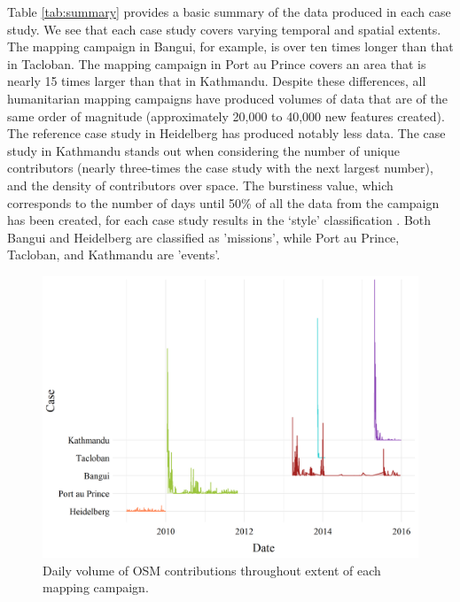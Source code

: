 Table \ref{tab:summary} provides a basic summary of the data produced in each case study. We see that each case study covers varying temporal and spatial extents. The mapping campaign in Bangui, for example, is over ten times longer than that in Tacloban. The mapping campaign in Port au Prince covers an area that is nearly 15 times larger than that in Kathmandu. Despite these differences, all humanitarian mapping campaigns have produced volumes of data that are of the same order of magnitude (approximately 20,000 to 40,000 new features created). The reference case study in Heidelberg has produced notably less data. The case study in Kathmandu stands out when considering the number of unique contributors (nearly three-times the case study with the next largest number), and the density of contributors over space. The burstiness value, which corresponds to the number of days until 50\% of all the data from the campaign has been created, for each case study results in the ‘style’ classification \parencite{dittus_mass_2017}. Both Bangui and Heidelberg are classified as 'missions', while Port au Prince, Tacloban, and Kathmandu are 'events'. 

\begin{figure} %
    \centering %
    \includegraphics[width = \textwidth]{Images/overtime.png} %
    \caption{Daily volume of OSM contributions throughout extent of each mapping campaign.} %
    \label{fig:time} %
\end{figure}

